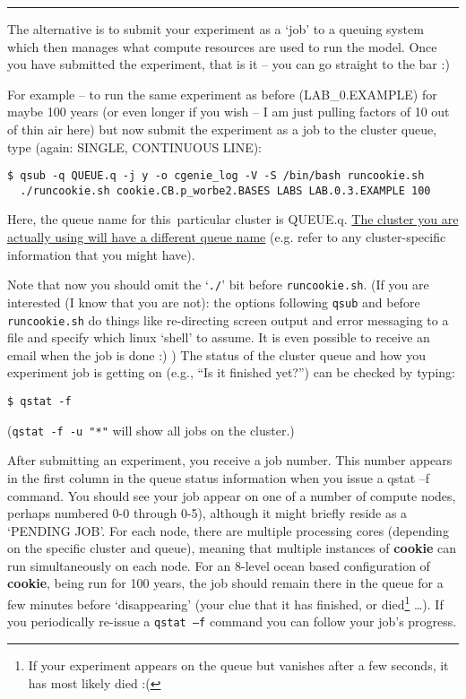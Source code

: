 \vspace{1mm}
\noindent\rule{4cm}{0.1mm}
\vspace{2mm}

\noindent The alternative is to submit your experiment as a ‘job’ to a queuing system which then manages what compute resources are used to run the model. Once you have submitted the experiment, that is it – you can go straight to the bar :)

For example -- to run the same experiment as before (\textsf{\footnotesize LAB\_0.EXAMPLE}) for maybe 100 years (or even longer if you wish – I am just pulling factors of 10 out of thin air here) but now submit the experiment as a job to the cluster queue, type (again: SINGLE, CONTINUOUS LINE):
\vspace{-1mm}
\small\begin{verbatim}
$ qsub -q QUEUE.q -j y -o cgenie_log -V -S /bin/bash runcookie.sh
  ./runcookie.sh cookie.CB.p_worbe2.BASES LABS LAB.0.3.EXAMPLE 100
\end{verbatim}\normalsize
\vspace{-1mm}

Here, the queue name for this\ particular cluster is \textsf{\footnotesize QUEUE.q}. \uline{The cluster you are actually using will have a different queue name} (e.g. refer to any cluster-specific information that you might have).

\vspace{1mm}
Note that now you should omit the ‘\texttt{./}’ bit before \texttt{runcookie.sh}.
(If you are interested (I know that you are not): the options following \texttt{qsub} and before \texttt{runcookie.sh} do things like re-directing screen output and error messaging to a file and specify which linux ‘shell’ to assume. It is even possible to receive an email when the job is done :) )
The status of the cluster queue and how you experiment job is getting on (e.g., “Is it finished yet?”) can be checked by typing:
\vspace{-1mm}
\small\begin{verbatim}
$ qstat -f
\end{verbatim}\normalsize
\vspace{-1mm}
(\texttt{qstat -f -u "*"} will show all jobs on the cluster.)

\vspace{1mm}
After submitting an experiment, you receive a job number. This number appears in the first column in the queue status information when you issue a qstat –f command. You should see your job appear on one of a number of compute nodes, perhaps numbered 0-0 through 0-5), although it might briefly reside as a ‘\textsf{\footnotesize PENDING JOB}’. For each node, there are multiple processing cores (depending on the specific cluster and queue), meaning that multiple instances of \textbf{cookie} can run simultaneously on each node. For an 8-level ocean based configuration of \textbf{cookie}, being run for 100 years, the job should remain there in the queue for a few minutes before ‘disappearing’ (your clue that it has finished, or died\footnote{If your experiment appears on the queue but vanishes after a few seconds, it has most likely died :(} …). If you periodically re-issue a \texttt{qstat –f} command you can follow your job’s progress.


